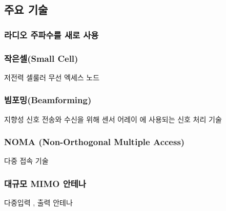 \documentclass{oblivoir}
\begin{document}
\subsection{주요 기술}
\subsubsection{라디오 주파수를 새로 사용}
\subsubsection{작은셀(Small Cell)}
저전력 셀룰러 무선 엑세스 노드
\subsubsection{빔포밍(Beamforming)}
지향성 신호 전송와 수신을 위해 센서 어레이 에 사용되는 신호 처리 기술
\subsubsection{NOMA (Non-Orthogonal Multiple Access)}
다중 접속 기술
\subsubsection{대규모 MIMO 안테나}
다중입력 , 출력 안테나
\newpage
\end{document}
